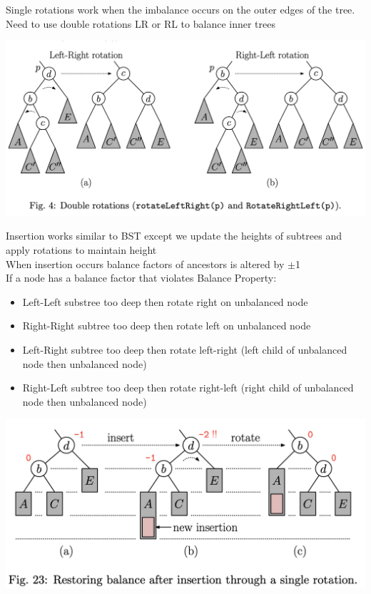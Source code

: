 \documentclass{article}
\begin{document}
  \newpage
  Single rotations work when the imbalance occurs on the outer edges of the tree. Need to use double rotations LR or RL to balance inner trees \\
  \begin{center}
  \includegraphics[scale=0.15]{FibTreeDoubleRotation}
  \end{center}
  Insertion works similar to BST except we update the heights of subtrees and apply rotations to maintain height \\
  When insertion occurs balance factors of ancestors is altered by $\pm$1\\
  If a node has a balance factor that violates Balance Property:
  \begin{itemize}[noitemsep]
  \item Left-Left substree too deep then rotate right on unbalanced node
  \item Right-Right subtree too deep then rotate left on unbalanced node
  \item Left-Right subtree too deep then rotate left-right (left child of unbalanced node then unbalanced node)
  \item Right-Left subtree too deep then rotate right-left (right child of unbalanced node then unbalanced node)
  \end{itemize}
  \begin{center}
  \includegraphics[scale=0.4]{AVLSingleRotationInsertion}
  \end{center}
\end{document}

